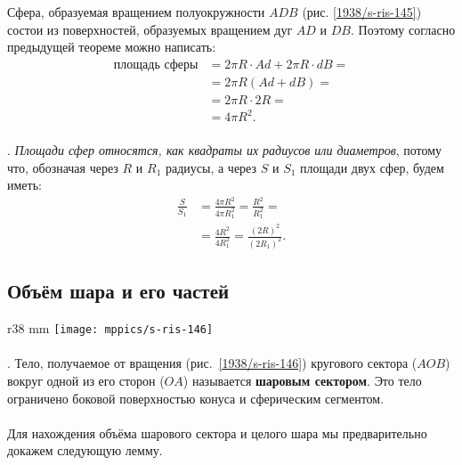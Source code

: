 Сфера, образуемая вращением полуокружности $ADB$ (рис. \ref{1938/s-ris-145}) состои из поверхностей, образуемых вращением дуг $AD$ и $DB$.
Поэтому согласно предыдущей теореме можно написать:
\begin{align*}
\text{площадь сферы} &= 2\pi R\cdot Ad + 2\pi R\cdot dB =
\\
&=2\pi R(Ad + dB) =
\\
&= 2\pi R\cdot 2R = 
\\
&=4\pi R^2.
\end{align*}

\paragraph{}\label{1938/s139}
.
\emph{Площади сфер относятся, как квадраты их радиусов или диаметров}, потому что, обозначая через $R$ и $R_1$ радиусы, а через $S$ и $S_1$ площади двух сфер, будем иметь:
\begin{align*}
\frac{S}{S_1} &= \frac{4\pi R^2}{4\pi R^2_1} =\frac{R^2}{R^2_1} = 
\\&=\frac{4R^2}{4R_1^2} =\frac{(2R)^2}{(2R_1)^2}.
\end{align*}

\subsection*{Объём шара и его частей}

{

\begin{wrapfigure}{r}{38 mm}
\vskip-14mm
\centering
\texttt{[image: mppics/s-ris-146]}
\caption{}\label{1938/s-ris-146}
\vskip-0mm
\end{wrapfigure}

\paragraph{}\label{1938/s140}
\mbox{.}
Тело, получаемое от вращения (рис.~\ref{1938/s-ris-146}) кругового сектора ($AOB$) вокруг одной из его сторон ($OA$) называется \textbf{шаровым сектором}.
Это тело ограничено боковой поверхностью конуса и сферическим сегментом.

}

\paragraph{}\label{1938/s141}
Для нахождения объёма шарового сектора и целого шара мы предварительно докажем следующую лемму.




